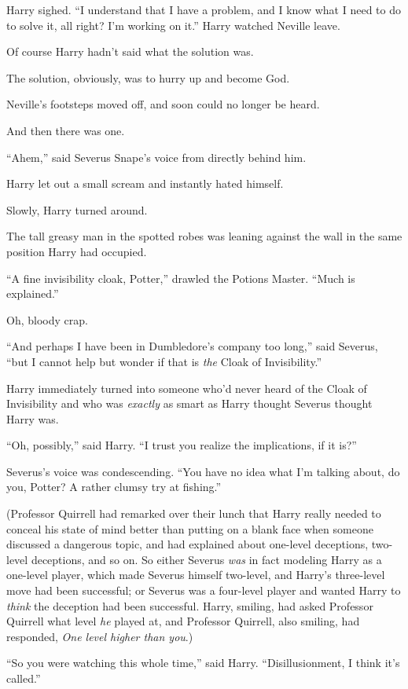 Harry sighed. “I understand that I have a problem, and I know what I need to do
to solve it, all right? I’m working on it.”
\later
Harry watched Neville leave.

Of course Harry hadn’t said what the solution was.

The solution, obviously, was to hurry up and become God.

Neville’s footsteps moved off, and soon could no longer be heard.

And then there was one.

“Ahem,” said Severus Snape’s voice from directly behind him.

Harry let out a small scream and instantly hated himself.

Slowly, Harry turned around.

The tall greasy man in the spotted robes was leaning against the wall in the
same position Harry had occupied.

“A fine invisibility cloak, Potter,” drawled the Potions Master. “Much is
explained.”

Oh, bloody crap.

“And perhaps I have been in Dumbledore’s company too long,” said Severus, “but
I cannot help but wonder if that is \emph{the} Cloak of Invisibility.”

Harry immediately turned into someone who’d never heard of the Cloak of
Invisibility and who was \emph{exactly} as smart as Harry thought Severus
thought Harry was.

“Oh, possibly,” said Harry. “I trust you realize the implications, if it is?”

Severus’s voice was condescending. “You have no idea what I’m talking about, do
you, Potter? A rather clumsy try at fishing.”

(Professor Quirrell had remarked over their lunch that Harry really needed to
conceal his state of mind better than putting on a blank face when someone
discussed a dangerous topic, and had explained about one-level deceptions,
two-level deceptions, and so on. So either Severus \emph{was} in fact modeling
Harry as a one-level player, which made Severus himself two-level, and Harry’s
three-level move had been successful; or Severus was a four-level player and
wanted Harry to \emph{think} the deception had been successful. Harry, smiling,
had asked Professor Quirrell what level \emph{he} played at, and Professor
Quirrell, also smiling, had responded, \emph{One level higher than you}.)

“So you were watching this whole time,” said Harry. “Disillusionment, I think
it’s called.”

